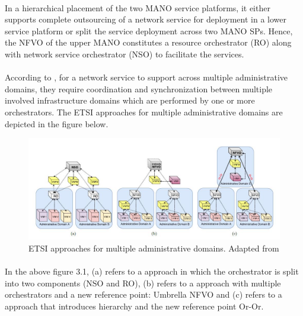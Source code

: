 \paragraph{}In a hierarchical placement of the two MANO service platforms, it either supports complete outsourcing of a network service for deployment in a lower service platform or split the service deployment across two MANO SPs. Hence, the NFVO of the upper MANO constitutes a resource orchestrator (RO) along with network service orchestrator (NSO) to facilitate the services.



\paragraph{}According to \cite{de2018network}, for a network service to support across multiple administrative domains, they require coordination and synchronization between multiple involved infrastructure domains which are performed by one or more orchestrators. The ETSI approaches for multiple administrative domains are depicted in the figure below.

\begin{figure} [H]
	\centering
	\includegraphics[width=0.8\linewidth]{"figures/ETSI approaches"}
	\caption{ETSI approaches for multiple administrative domains. Adapted from \cite{de2018network}}
	\label{fig:etsi-approaches}
\end{figure}


\paragraph{}In the above figure 3.1, (a) refers to a approach in which the orchestrator is split into two components (NSO and RO), (b) refers to a approach with multiple orchestrators and a new reference point: Umbrella NFVO and (c) refers to a approach that introduces hierarchy and the new reference point Or-Or.